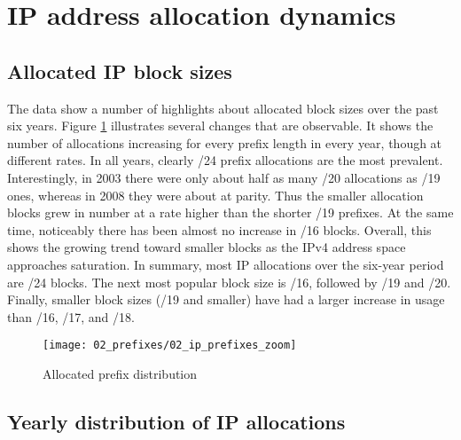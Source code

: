 \section{IP address allocation dynamics}
\label{sec:allocations}

\subsection{Allocated IP block sizes}

The data show a number of highlights about allocated block sizes over the past six years.  Figure \ref{fig:IP allocations} illustrates several changes that are observable. It shows the number of allocations increasing for every prefix length in every year, though at different rates. In all years, clearly /24 prefix allocations are the most prevalent.  Interestingly, in 2003 there were only about half as
many /20 allocations as /19 ones, whereas in 2008 they were about at parity.  Thus the smaller allocation blocks grew in number at a rate higher than the shorter /19 prefixes.  At the same time, noticeably there has been almost no increase in /16 blocks. Overall, this shows the growing trend
toward smaller blocks as the IPv4 address space approaches saturation.  In summary, most IP allocations over the six-year period are /24 blocks. The next
most popular block size is /16, followed by /19 and /20. Finally, smaller block
sizes (/19 and smaller) have had a larger increase in usage than /16, /17, and
/18.

\begin{figure}[htbp]
 	\centering
 		\texttt{[image: 02\_prefixes/02\_ip\_prefixes\_zoom]}
	\caption{Allocated prefix distribution}
 	\label{fig:IP allocations}
\end{figure}

\subsection{Yearly distribution of IP allocations}


